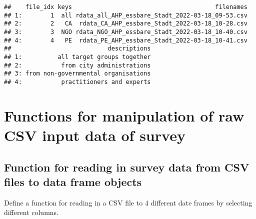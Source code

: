 \documentclass[
]{article}
\begin{document}
\begin{verbatim}
##    file_idx keys                                        filenames
## 1:        1  all rdata_all_AHP_essbare_Stadt_2022-03-18_09-53.csv
## 2:        2   CA  rdata_CA_AHP_essbare_Stadt_2022-03-18_10-28.csv
## 3:        3  NGO rdata_NGO_AHP_essbare_Stadt_2022-03-18_10-40.csv
## 4:        4   PE  rdata_PE_AHP_essbare_Stadt_2022-03-18_10-41.csv
##                           descriptions
## 1:          all target groups together
## 2:           from city administrations
## 3: from non-governmental organisations
## 4:           practitioners and experts
\end{verbatim}

\hypertarget{functions-for-manipulation-of-raw-csv-input-data-of-survey}{%
\section{Functions for manipulation of raw CSV input data of
survey}\label{functions-for-manipulation-of-raw-csv-input-data-of-survey}}

\hypertarget{function-for-reading-in-survey-data-from-csv-files-to-data-frame-objects}{%
\subsection{Function for reading in survey data from CSV files to data
frame
objects}\label{function-for-reading-in-survey-data-from-csv-files-to-data-frame-objects}}

Define a function for reading in a CSV file to 4 different date frames
by selecting different columns.
\end{document}
